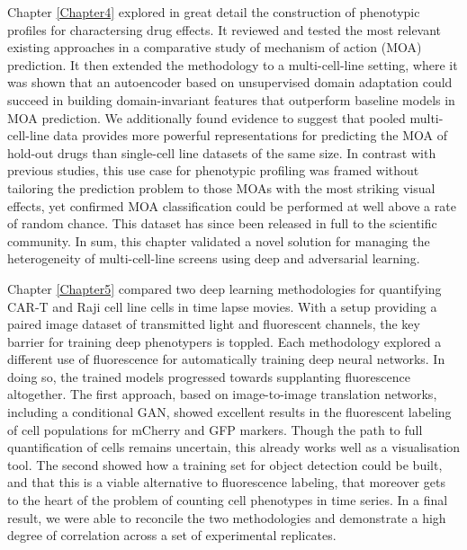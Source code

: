 Chapter \ref{Chapter4} explored in great detail the construction of phenotypic profiles for charactersing drug effects. It reviewed and tested the most relevant existing approaches in a comparative study of mechanism of action (MOA) prediction. It then extended the methodology to a multi-cell-line setting, where it was shown that an autoencoder based on unsupervised domain adaptation could succeed in building domain-invariant features that outperform baseline models in MOA prediction. We additionally found evidence to suggest that pooled multi-cell-line data provides more powerful representations for predicting the MOA of hold-out drugs than single-cell line datasets of the same size. In contrast with previous studies, this use case for phenotypic profiling was framed without tailoring the prediction problem to those MOAs with the most striking visual effects, yet confirmed MOA classification could be performed at well above a rate of random chance. This dataset has since been released in full to the scientific community. In sum, this chapter validated a novel solution for managing the heterogeneity of multi-cell-line screens using deep and adversarial learning.

Chapter \ref{Chapter5} compared two deep learning methodologies for quantifying CAR-T and Raji cell line cells in time lapse movies. With a setup providing a paired image dataset of transmitted light and fluorescent channels, the key barrier for training deep phenotypers is toppled. Each methodology explored a different use of fluorescence for automatically training deep neural networks. In doing so, the trained models progressed towards supplanting fluorescence altogether. The first approach, based on image-to-image translation networks, including a conditional GAN, showed excellent results in the fluorescent labeling of cell populations for mCherry and GFP markers. Though the path to full quantification of cells remains uncertain, this already works well as a visualisation tool. The second showed how a training set for object detection could be built, and that this is a viable alternative to fluorescence labeling, that moreover gets to the heart of the problem of counting cell phenotypes in time series. In a final result, we were able to reconcile the two methodologies and demonstrate a high degree of correlation across a set of experimental replicates.

